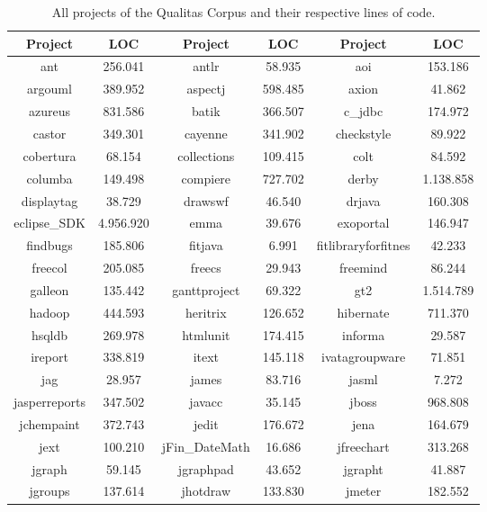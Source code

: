 \setlength{\extrarowheight}{-0.02em}
\begin{table}
	\caption[Overview over the projects in the Qualitas Corpus.]{All projects of the Qualitas Corpus and their respective lines of code.}
	\label{table:qualitasCorpusAll}
	\begin{tabularx}{\textwidth}{c|c||c|c||C|c}
		\textbf{Project} & \textbf{LOC} & \textbf{Project} & \textbf{LOC} & \textbf{Project} & \textbf{LOC} \\
		\hline
		ant & 256.041 & antlr & 58.935 & aoi & 153.186 \\
		argouml & 389.952 & aspectj & 598.485 & axion & 41.862 \\
		azureus & 831.586 & batik & 366.507 & c\_jdbc & 174.972 \\
		castor & 349.301 & cayenne & 341.902 & checkstyle & 89.922 \\
		cobertura & 68.154 & collections & 109.415 & colt & 84.592 \\
		columba & 149.498 & compiere & 727.702 & derby & 1.138.858 \\
		displaytag & 38.729 & drawswf & 46.540 & drjava & 160.308 \\
		eclipse\_SDK & 4.956.920 & emma & 39.676 & exoportal & 146.947 \\
		findbugs & 185.806 & fitjava & 6.991 & fitlibraryforfitnes & 42.233 \\
		freecol & 205.085 & freecs & 29.943 & freemind & 86.244 \\
		galleon & 135.442 & ganttproject & 69.322 & gt2 & 1.514.789 \\
		hadoop & 444.593 & heritrix & 126.652 & hibernate & 711.370 \\
		hsqldb & 269.978 & htmlunit & 174.415 & informa & 29.587 \\
		ireport & 338.819 & itext & 145.118 & ivatagroupware & 71.851 \\
		jag & 28.957 & james & 83.716 & jasml & 7.272 \\
		jasperreports & 347.502 & javacc & 35.145 & jboss & 968.808 \\
		jchempaint & 372.743 & jedit & 176.672 & jena & 164.679 \\
		jext & 100.210 & jFin\_DateMath & 16.686 & jfreechart & 313.268 \\
		jgraph & 59.145 & jgraphpad & 43.652 & jgrapht & 41.887 \\
		jgroups & 137.614 & jhotdraw & 133.830 & jmeter & 182.552 \\

\end{tabularx}
\end{table}
